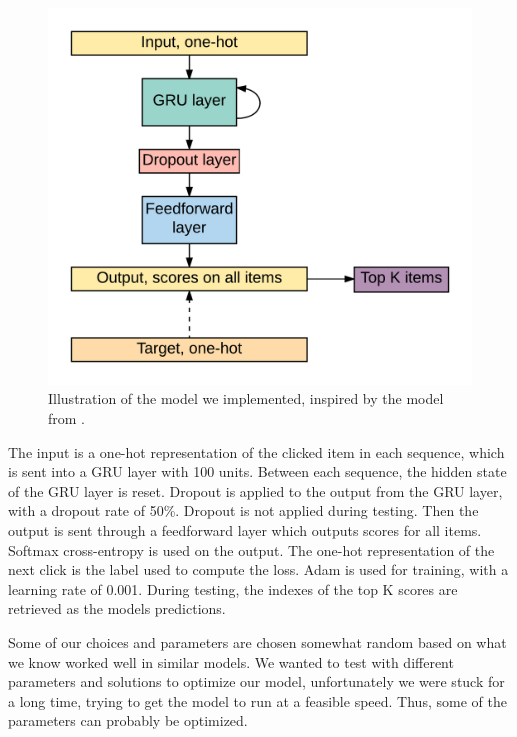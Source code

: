 \begin{figure}[htp]
	\centering
	\includegraphics[width=1.0\textwidth]{fig/skrede-rnn.png}
	\caption{Illustration of the model we implemented, inspired by the model from \cite{DBLP:journals/corr/HidasiKBT15}.}
	\label{fig:skrede-rnn}
\end{figure}

The input is a one-hot representation of the clicked item in each sequence, which is sent into a GRU layer with 100 units. Between each sequence, the hidden state of the GRU layer is reset. Dropout is applied to the output from the GRU layer, with a dropout rate of 50\%. Dropout is not applied during testing. Then the output is sent through a feedforward layer which outputs scores for all items. Softmax cross-entropy is used on the output. The one-hot representation of the next click is the label used to compute the loss. Adam \cite{DBLP:journals/corr/KingmaB14} is used for training, with a learning rate of 0.001. During testing, the indexes of the top K scores are retrieved as the models predictions.

Some of our choices and parameters are chosen somewhat random based on what we know worked well in similar models. We wanted to test with different parameters and solutions to optimize our model, unfortunately we were stuck for a long time, trying to get the model to run at a feasible speed. Thus, some of the parameters can probably be optimized.

